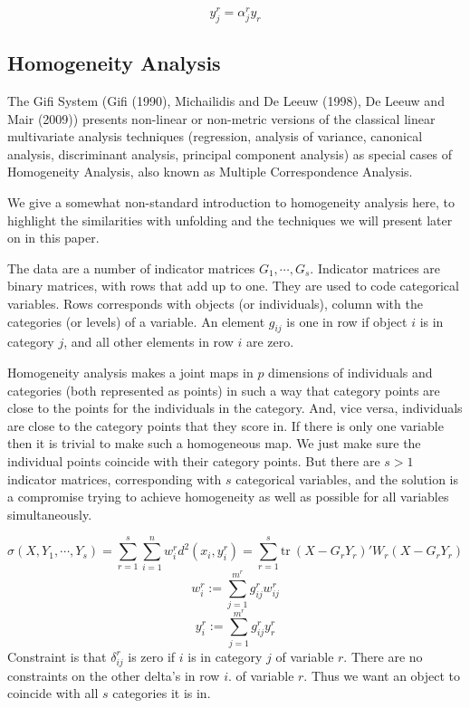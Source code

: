 \documentclass[
  12pt,
]{article}
\begin{document}
\[
y_j^r=\alpha_{j}^ry_r
\]

\subsection{Homogeneity Analysis}\label{homogeneity-analysis}

The Gifi System (Gifi (1990), Michailidis and De Leeuw (1998), De Leeuw and Mair (2009)) presents non-linear or non-metric versions of the classical linear multivariate analysis techniques (regression, analysis of variance, canonical analysis, discriminant analysis, principal component analysis) as special cases of Homogeneity Analysis, also known as Multiple Correspondence Analysis.

We give a somewhat non-standard introduction to homogeneity analysis here, to highlight the
similarities with unfolding and the techniques we will present later on in this paper.

The data are a number of indicator matrices \(G_1,\cdots,G_s\). Indicator matrices are binary matrices, with rows that add up to one. They are
used to code categorical variables. Rows corresponds with objects
(or individuals), column with the categories (or levels) of a variable.
An element \(g_{ij}\) is one in row if object \(i\) is in category \(j\),
and all other elements in row \(i\) are zero.

Homogeneity analysis makes a joint maps in \(p\) dimensions of individuals
and categories (both represented as points) in such a way that category points are close to the points for the individuals in the category. And, vice versa, individuals are close to the category points that they score in.
If there is only one variable then it is trivial to make such a
homogeneous map. We just make sure the individual points coincide with
their category points. But there are \(s>1\) indicator matrices, corresponding with \(s\) categorical variables, and the solution is a compromise trying to achieve homogeneity as well as possible for all variables simultaneously.

\[
\sigma(X,Y_1,\cdots,Y_s)=\sum_{r=1}^s\sum_{i=1}^nw_i^rd^2(x_i,y_i^r)=
\sum_{r=1}^s\text{tr}\ (X-G_rY_r)'W_r(X-G_rY_r)
\]
\[
w_i^r:=\sum_{j=1}^{m^r}g_{ij}^rw_{ij}^r
\]
\[
y_{i}^r:=\sum_{j=1}^{m^r}g_{ij}^ry_r^r
\]
Constraint is that \(\delta_{ij}^r\) is zero if \(i\) is in category \(j\) of
variable \(r\). There are no constraints on the other delta's in row \(i\).
of variable \(r\). Thus we want an object to coincide with all \(s\) categories
it is in.
\end{document}
